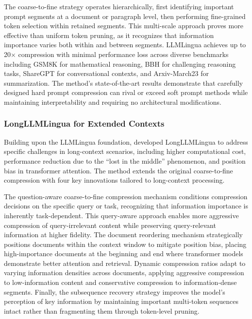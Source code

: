 The coarse-to-fine strategy operates hierarchically, first identifying important prompt segments at a document or paragraph level, then performing fine-grained token selection within retained segments. This multi-scale approach proves more effective than uniform token pruning, as it recognizes that information importance varies both within and between segments. LLMLingua achieves up to 20$\times$ compression with minimal performance loss across diverse benchmarks including GSM8K for mathematical reasoning, BBH for challenging reasoning tasks, ShareGPT for conversational contexts, and Arxiv-March23 for summarization. The method's state-of-the-art results demonstrate that carefully designed hard prompt compression can rival or exceed soft prompt methods while maintaining interpretability and requiring no architectural modifications.

\subsubsection{LongLLMLingua for Extended Contexts}

Building upon the LLMLingua foundation, \citet{jiang2024longllmlingua} developed LongLLMLingua to address specific challenges in long-context scenarios, including higher computational cost, performance reduction due to the ``lost in the middle'' phenomenon, and position bias in transformer attention. The method extends the original coarse-to-fine compression with four key innovations tailored to long-context processing.

The question-aware coarse-to-fine compression mechanism conditions compression decisions on the specific query or task, recognizing that information importance is inherently task-dependent. This query-aware approach enables more aggressive compression of query-irrelevant content while preserving query-relevant information at higher fidelity. The document reordering mechanism strategically positions documents within the context window to mitigate position bias, placing high-importance documents at the beginning and end where transformer models demonstrate better attention and retrieval. Dynamic compression ratios adapt to varying information densities across documents, applying aggressive compression to low-information content and conservative compression to information-dense segments. Finally, the subsequence recovery strategy improves the model's perception of key information by maintaining important multi-token sequences intact rather than fragmenting them through token-level pruning.

